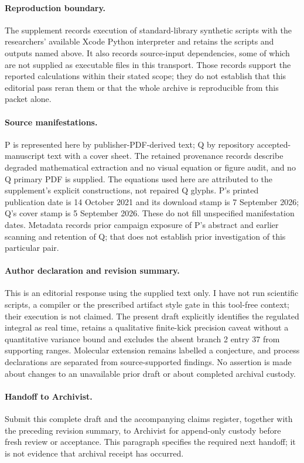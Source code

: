 \documentclass{article}
\begin{document}
\paragraph{Reproduction boundary.}
The supplement records execution of standard-library synthetic scripts with the researchers' available Xcode Python interpreter and retains the scripts and outputs named above. It also records source-input dependencies, some of which are not supplied as executable files in this transport. Those records support the reported calculations within their stated scope; they do not establish that this editorial pass reran them or that the whole archive is reproducible from this packet alone.

\paragraph{Source manifestations.}
P is represented here by publisher-PDF-derived text; Q by repository accepted-manuscript text with a cover sheet. The retained provenance records describe degraded mathematical extraction and no visual equation or figure audit, and no Q primary PDF is supplied. The equations used here are attributed to the supplement's explicit constructions, not repaired Q glyphs. P's printed publication date is 14 October 2021 and its download stamp is 7 September 2026; Q's cover stamp is 5 September 2026. These do not fill unspecified manifestation dates. Metadata records prior campaign exposure of P's abstract and earlier scanning and retention of Q; that does not establish prior investigation of this particular pair.

\paragraph{Author declaration and revision summary.}
This is an editorial response using the supplied text only. I have not run scientific scripts, a compiler or the prescribed artifact style gate in this tool-free context; their execution is not claimed. The present draft explicitly identifies the regulated integral as real time, retains a qualitative finite-kick precision caveat without a quantitative variance bound and excludes the absent branch 2 entry 37 from supporting ranges. Molecular extension remains labelled a conjecture, and process declarations are separated from source-supported findings. No assertion is made about changes to an unavailable prior draft or about completed archival custody.

\paragraph{Handoff to Archivist.}
Submit this complete draft and the accompanying claims register, together with the preceding revision summary, to Archivist for append-only custody before fresh review or acceptance. This paragraph specifies the required next handoff; it is not evidence that archival receipt has occurred.
\end{document}

